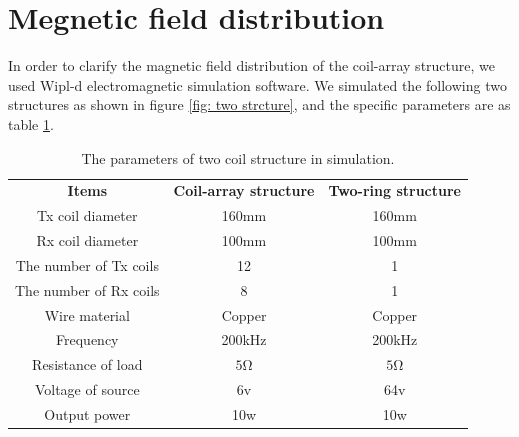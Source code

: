 \section{Megnetic field distribution}
In order to clarify the magnetic field distribution of the coil-array structure, we used Wipl-d electromagnetic simulation software. We simulated the following two structures as shown in figure \ref{fig: two strcture}, and the specific parameters are as table \ref{table: simulation parameters}.

\begin{table}[!t]
    \centering
    \caption{The parameters of two coil structure in simulation.}
    \begin{tabular}{ c|c|c }
        \thickhline
        \textbf{Items}         & \textbf{Coil-array structure} & \textbf{Two-ring structure} \\
        \thickhline
        Tx coil diameter       & 160mm                         & 160mm                       \\ \hline
        Rx coil diameter       & 100mm                         & 100mm                       \\ \hline
        The number of Tx coils & 12                            & 1                           \\ \hline
        The number of Rx coils & 8                             & 1                           \\ \hline
        Wire material          & Copper                        & Copper                      \\ \hline
        Frequency              & 200kHz                        & 200kHz                      \\ \hline
        Resistance of load     & $5 \si{\ohm}$                 & $5 \si{\ohm}$               \\ \hline
        Voltage of source      & 6v                            & 64v                         \\ \hline
        Output power           & 10w                           & 10w                         \\ \hline
    \end{tabular}
    \label{table: simulation parameters}
\end{table}

